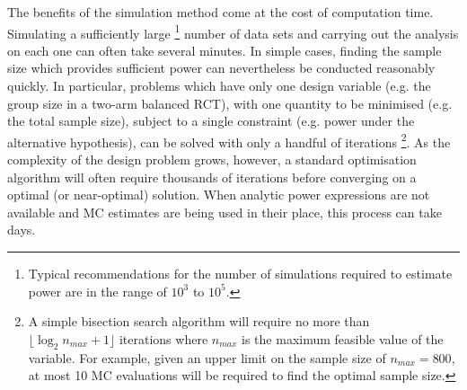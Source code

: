 \documentclass{article} %
\begin{document}

The benefits of the simulation method come at the cost of computation time. Simulating a sufficiently large
\footnote{Typical recommendations for the number of simulations required to estimate power are in the range of $10^3$ to $10^5$.}
number of data sets and carrying out the analysis on each one can often take several minutes. In simple cases, finding the sample size which provides sufficient power can nevertheless be conducted reasonably quickly. In particular, problems which have only one design variable (e.g. the group size in a two-arm balanced RCT), with one quantity to be minimised (e.g. the total sample size), subject to a single constraint (e.g. power under the alternative hypothesis), can be solved with only a handful of iterations
\footnote{A simple bisection search algorithm will require no more than $\lfloor \log_{2}{n_{max}}+1 \rfloor$ iterations where $n_{max}$ is the maximum feasible value of the variable. For example, given an upper limit on the sample size of $n_{max} = 800$, at most 10 MC evaluations will be required to find the optimal sample size.}.
As the complexity of the design problem grows, however, a standard optimisation algorithm will often require thousands of iterations before converging on a optimal (or near-optimal) solution. When analytic power expressions are not available and MC estimates are being used in their place, this process can take days.
\end{document}

